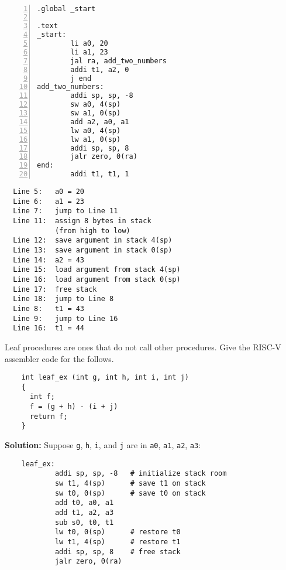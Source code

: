 \newpage
\begin{eg}~

\begin{minipage}{0.45\textwidth}
\begin{Verbatim}[numbers=left,xleftmargin=5mm]
.global _start

.text
_start:
        li a0, 20
        li a1, 23
        jal ra, add_two_numbers 
        addi t1, a2, 0
        j end 
add_two_numbers:
        addi sp, sp, -8
        sw a0, 4(sp)
        sw a1, 0(sp)
        add a2, a0, a1
        lw a0, 4(sp)
        lw a1, 0(sp)
        addi sp, sp, 8
        jalr zero, 0(ra)
end:    
        addi t1, t1, 1
\end{Verbatim}
\end{minipage}
\begin{minipage}{0.55\textwidth}
\color{red}
\begin{verbatim}
  Line 5:   a0 = 20
  Line 6:   a1 = 23
  Line 7:   jump to Line 11
  Line 11:  assign 8 bytes in stack 
            (from high to low)
  Line 12:  save argument in stack 4(sp)
  Line 13:  save argument in stack 0(sp)
  Line 14:  a2 = 43
  Line 15:  load argument from stack 4(sp)
  Line 16:  load argument from stack 0(sp)
  Line 17:  free stack
  Line 18:  jump to Line 8
  Line 8:   t1 = 43
  Line 9:   jump to Line 16
  Line 16:  t1 = 44
\end{verbatim}
\end{minipage}
\end{eg}

\begin{eg}
  Leaf procedures are ones that do not call other procedures. Give the RISC-V assembler code for the follows. 
  \begin{verbatim}
    int leaf_ex (int g, int h, int i, int j)
    {
      int f;
      f = (g + h) - (i + j)
      return f;
    }
  \end{verbatim}

  \textbf{Solution:} 
  Suppose \verb|g|, \verb|h|, \verb|i|, and \verb|j| are in \verb|a0|, \verb|a1|, \verb|a2|, \verb|a3|: 
  \begin{verbatim}
    leaf_ex: 
            addi sp, sp, -8   # initialize stack room
            sw t1, 4(sp)      # save t1 on stack
            sw t0, 0(sp)      # save t0 on stack
            add t0, a0, a1
            add t1, a2, a3
            sub s0, t0, t1
            lw t0, 0(sp)      # restore t0
            lw t1, 4(sp)      # restore t1
            addi sp, sp, 8    # free stack
            jalr zero, 0(ra)
  \end{verbatim}
\end{eg}

